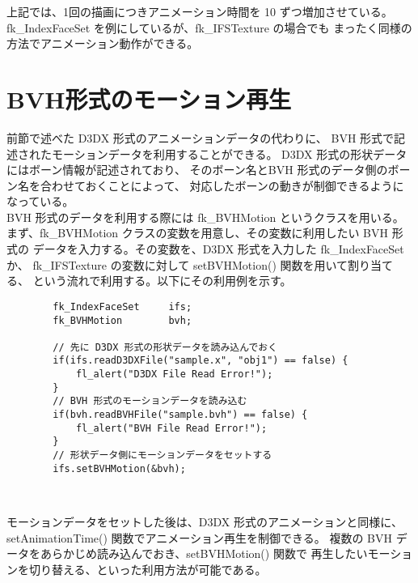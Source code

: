 上記では、1回の描画につきアニメーション時間を 10 ずつ増加させている。
fk\_IndexFaceSet を例にしているが、fk\_IFSTexture の場合でも
まったく同様の方法でアニメーション動作ができる。

\section{BVH形式のモーション再生} \label{subsubsec:bvhmotion}
前節で述べた D3DX 形式のアニメーションデータの代わりに、
BVH 形式で記述されたモーションデータを利用することができる。
D3DX 形式の形状データにはボーン情報が記述されており、
そのボーン名とBVH 形式のデータ側のボーン名を合わせておくことによって、
対応したボーンの動きが制御できるようになっている。
\\
BVH 形式のデータを利用する際には fk\_BVHMotion というクラスを用いる。
まず、fk\_BVHMotion クラスの変数を用意し、その変数に利用したい BVH 形式の
データを入力する。その変数を、D3DX 形式を入力した fk\_IndexFaceSet か、
fk\_IFSTexture の変数に対して setBVHMotion() 関数を用いて割り当てる、
という流れで利用する。以下にその利用例を示す。
\\
\begin{breakbox}
\begin{verbatim}
        fk_IndexFaceSet     ifs;
        fk_BVHMotion        bvh;
        
        // 先に D3DX 形式の形状データを読み込んでおく
        if(ifs.readD3DXFile("sample.x", "obj1") == false) {
            fl_alert("D3DX File Read Error!");
        }
        // BVH 形式のモーションデータを読み込む
        if(bvh.readBVHFile("sample.bvh") == false) {
            fl_alert("BVH File Read Error!");
        }
        // 形状データ側にモーションデータをセットする
        ifs.setBVHMotion(&bvh);
\end{verbatim}
\end{breakbox} ~

モーションデータをセットした後は、D3DX 形式のアニメーションと同様に、
setAnimationTime() 関数でアニメーション再生を制御できる。
複数の BVH データをあらかじめ読み込んでおき、setBVHMotion() 関数で
再生したいモーションを切り替える、といった利用方法が可能である。
